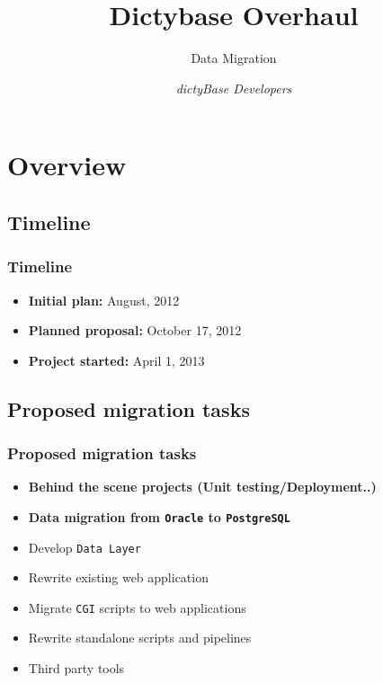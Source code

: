 \documentclass[hyperref={pdfpagelabels=false}, compress]{beamer}
\title{\textbf{Dictybase Overhaul}}
\subtitle{Data Migration}
\author{\textit{dictyBase Developers}}
\begin{document}



\section{Overview}

\subsection{Timeline}
 \begin{frame}
 \frametitle{Timeline}
   \begin{itemize}
   
      \item  \textbf{Initial plan:} August, 2012
      \item \textbf{Planned proposal:} October 17, 2012
      \item \textbf{Project started:} April 1, 2013
      
   \end{itemize}
  \end{frame}

\subsection{Proposed migration tasks}
\begin{frame}
	\frametitle{Proposed migration tasks}
	
    	\begin{itemize}
    	\item \textbf{Behind the scene projects (Unit testing/Deployment..)}
		\item \textbf{Data migration from \texttt{Oracle} to \texttt{PostgreSQL}}
		\vspace{0.5cm}
    		\item Develop \texttt{Data Layer}
    		\item Rewrite existing web application
    		\item Migrate \texttt{CGI} scripts to web applications 
    		\item Rewrite standalone scripts and pipelines
    		\item Third party tools
	\end{itemize}
\end{frame}
\end{document}
